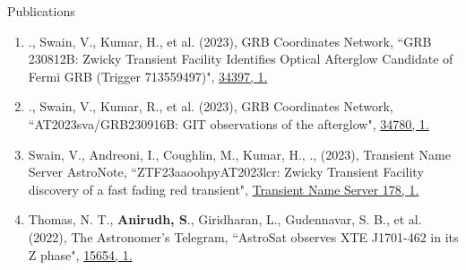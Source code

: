 \begin{section}{Publications}
    \begin{enumerate}
        \item \me., Swain, V., Kumar, H., et al. (2023), GRB Coordinates Network, {``GRB 230812B: Zwicky Transient Facility Identifies Optical Afterglow Candidate of Fermi GRB (Trigger 713559497)"}, \href{https://gcn.nasa.gov/circulars/34397}{34397, 1.}
        \vspace{-0.2em}

        \item \me., Swain, V., Kumar, R., et al. (2023), GRB Coordinates Network, {``AT2023sva/GRB230916B: GIT observations of the afterglow"}, \href{https://gcn.nasa.gov/circulars/34780}{34780, 1.}
        
        \vspace{-0.2em}
        
        

        \item Swain, V., Andreoni, I., Coughlin, M., Kumar, H., \me., (2023), Transient Name Server AstroNote, {``ZTF23aaoohpy\/AT2023lcr: Zwicky Transient Facility discovery of a fast fading red transient"}, \href{https://www.wis-tns.org/astronotes/astronote/2023-178}{Transient Name Server 178, 1.}
        
        \vspace{-0.2em}

        \item Thomas, N. T., \textbf{Anirudh, S}., Giridharan, L., Gudennavar, S. B., et al. (2022), The Astronomer's Telegram, {``AstroSat observes XTE J1701-462 in its Z phase"}, \href{https://www.astronomerstelegram.org/?read=15654}{15654, 1.}
    \end{enumerate}

\end{section}
